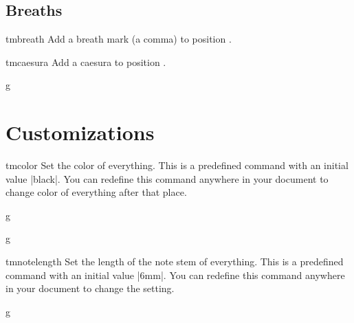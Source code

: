 \documentclass[11pt,a4paper]{ltxdoc}
\begin{document}
\subsection{Breaths}\label{sec:inline:breaths}
\begin{docCommand}{tmbreath}{}
  Add a breath mark (a comma) to position .
\end{docCommand}
\begin{docCommand}{tmcaesura}{}
  Add a caesura to position .
\end{docCommand}
\begin{dispExample}
\begin{tmsinglestaff}
  \begin{tmstaff}{g}
  \end{tmstaff}
\end{tmsinglestaff}
\end{dispExample}
\section{Customizations}\label{sec:custom}
\begin{docCommand}{tmcolor}{}
  Set the color of everything. This is a predefined command with an initial value 
  |black|. You can redefine this command anywhere in your document to change 
  color of everything after that place.
\end{docCommand}
\begin{dispExample}
\begin{tmmultiplestaves}[0pt]%
  \begin{tmstaff}{g}
    \renewcommand\tmcolor{red}
    \renewcommand\tmcolor{black}
  \end{tmstaff}%
  \begin{tmstaff}{g}
    \begingroup
      \renewcommand\tmcolor{red}
    \endgroup
  \end{tmstaff}%
\end{tmmultiplestaves}
\end{dispExample}
\begin{docCommand}{tmnotelength}{}
  Set the length of the note stem of everything. This is a predefined command 
  with an initial value |6mm|. You can redefine this command anywhere in your 
  document to change the setting.
\end{docCommand}
\begin{dispExample}
\begin{tmsinglestaff}%
  \begin{tmstaff}{g}
    \begin{tmbeam}
      \renewcommand\tmnotelength{1.8cm}
    \end{tmbeam}
  \end{tmstaff}%
\end{tmsinglestaff}
\end{dispExample}
\end{document}
